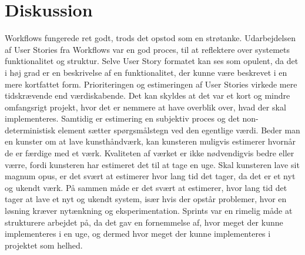 \section{Diskussion}
\label{sec:conclusion_discussion}
Workflows fungerede ret godt, trods det opstod som en strøtanke. Udarbejdelsen af User Stories fra Workflows var en god proces, til at reflektere over systemets funktionalitet og struktur.
Selve User Story formatet kan ses som opulent, da det i høj grad er en beskrivelse af en funktionalitet, der kunne være beskrevet i en mere kortfattet form.
Prioriteringen og estimeringen af User Stories virkede mere tidskrævende end værdiskabende. Det kan skyldes at det var et kort og mindre omfangsrigt projekt, hvor det er nemmere at have overblik over, hvad der skal implementeres.
Samtidig er estimering en subjektiv proces og det non-deterministisk element sætter spørgsmålstegn ved den egentlige værdi. 
Beder man en kunster om at lave kunsthåndværk, kan kunsteren muligvis estimerer hvornår de er færdige med et værk. Kvaliteten af værket er ikke nødvendigvis bedre eller værre, fordi kunsteren har estimeret det til at tage en uge.
Skal kunsteren lave sit magnum opus, er det svært at estimerer hvor lang tid det tager, da det er et nyt og ukendt værk. 
På sammen måde er det svært at estimerer, hvor lang tid det tager at lave et nyt og ukendt system, især hvis der opstår problemer, hvor en løsning kræver nytænkning og eksperimentation.
Sprints var en rimelig måde at strukturere arbejdet på, da det gav en fornemmelse af, hvor meget der kunne implementeres i en uge, og dermed hvor meget der kunne implementeres i projektet som helhed.

